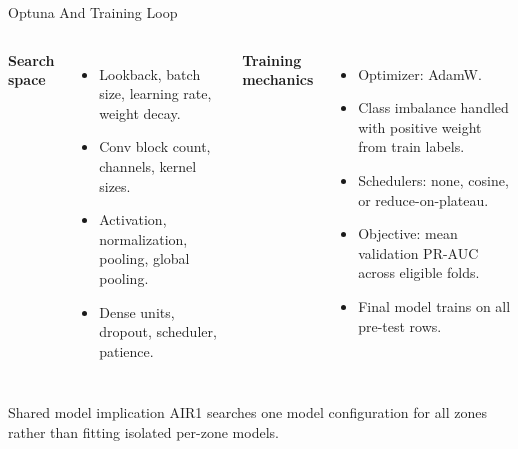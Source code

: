 \documentclass[aspectratio=169]{beamer}
\begin{document}
\begin{frame}[shrink=4]{Optuna And Training Loop}
\begin{columns}[T,onlytextwidth]
\textbf{Search space}
\begin{itemize}
  \item Lookback, batch size, learning rate, weight decay.
  \item Conv block count, channels, kernel sizes.
  \item Activation, normalization, pooling, global pooling.
  \item Dense units, dropout, scheduler, patience.
\end{itemize}

\textbf{Training mechanics}
\begin{itemize}
  \item Optimizer: AdamW.
  \item Class imbalance handled with positive weight from train labels.
  \item Schedulers: none, cosine, or reduce-on-plateau.
  \item Objective: mean validation PR-AUC across eligible folds.
  \item Final model trains on all pre-test rows.
\end{itemize}
\end{columns}
\tightsep
\begin{block}{Shared model implication}
\small AIR1 searches one model configuration for all zones rather than fitting isolated per-zone models.
\end{block}
\end{frame}
\end{document}
